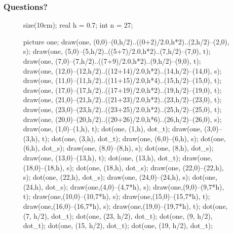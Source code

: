 \documentclass[pdf]{beamer}
\begin{document}
\begin{frame}[fragile]
	\frametitle{Questions?}
	\begin{figure}[ht]
		\centering
		\begin{asy}
			size(10cm);
			real h = 0.7;
			int n = 27;

			picture one;
			draw(one, (0,0)--(0,h/2)..((0+2)/2.0,h*2)..(2,h/2)--(2,0), s);
			draw(one, (5,0)--(5,h/2)..((5+7)/2.0,h*2)..(7,h/2)--(7,0), t);
			draw(one, (7,0)--(7,h/2)..((7+9)/2.0,h*2)..(9,h/2)--(9,0), t);
			draw(one, (12,0)--(12,h/2)..((12+14)/2.0,h*2)..(14,h/2)--(14,0), s);
			draw(one, (11,0)--(11,h/2)..((11+15)/2.0,h*4)..(15,h/2)--(15,0), t);
			draw(one, (17,0)--(17,h/2)..((17+19)/2.0,h*2)..(19,h/2)--(19,0), t);
			draw(one, (21,0)--(21,h/2)..((21+23)/2.0,h*2)..(23,h/2)--(23,0), t);
			draw(one, (23,0)--(23,h/2)..((23+25)/2.0,h*2)..(25,h/2)--(25,0), t);
			draw(one, (20,0)--(20,h/2)..((20+26)/2.0,h*6)..(26,h/2)--(26,0), s);
			draw(one, (1,0)--(1,h), t);
			dot(one, (1,h), dot_t);
			draw(one, (3,0)--(3,h), t);
			dot(one, (3,h), dot_t);
			draw(one, (6,0)--(6,h), s);
			dot(one, (6,h), dot_s);
			draw(one, (8,0)--(8,h), s);
			dot(one, (8,h), dot_s);
			draw(one, (13,0)--(13,h), t);
			dot(one, (13,h), dot_t);
			draw(one, (18,0)--(18,h), s);
			dot(one, (18,h), dot_s);
			draw(one, (22,0)--(22,h), s);
			dot(one, (22,h), dot_s);
			draw(one, (24,0)--(24,h), s);
			dot(one, (24,h), dot_s);
			draw(one,(4,0)--(4,7*h), s);
			draw(one,(9,0)--(9,7*h), t);
			draw(one,(10,0)--(10,7*h), s);
			draw(one,(15,0)--(15,7*h), t);
			draw(one,(16,0)--(16,7*h), s);
			draw(one,(19,0)--(19,7*h), t);
			dot(one, (7, h/2), dot_t);
			dot(one, (23, h/2), dot_t);
			dot(one, (9, h/2), dot_t);
			dot(one, (15, h/2), dot_t);
			dot(one, (19, h/2), dot_t);


\end{asy}
\end{figure}
\end{frame}
\end{document}
